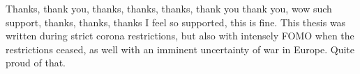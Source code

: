Thanks, thank you, thanks, thanks, thanks, thank you thank you, wow such support, thanks, thanks, thanks I feel so supported, this is fine. This thesis was written during strict corona restrictions, but also with intensely FOMO when the restrictions ceased, as well with an imminent uncertainty of war in Europe. Quite proud of that.